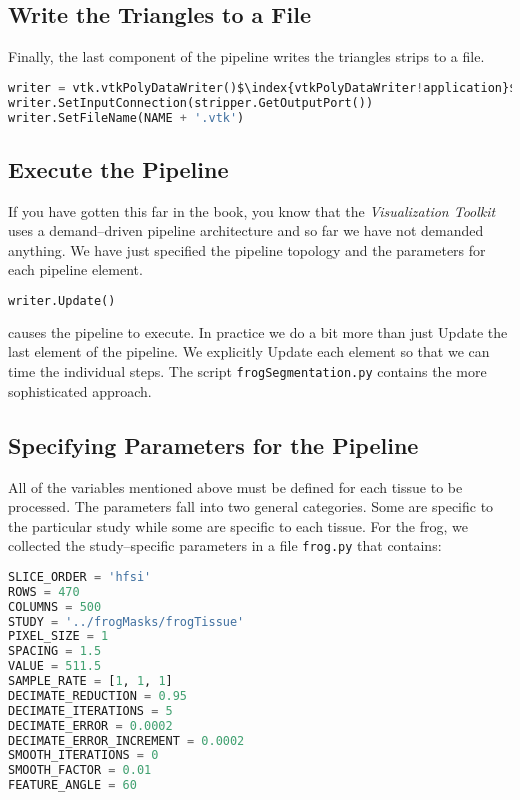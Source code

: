 \subsection{Write the Triangles to a File}

Finally, the last component of the pipeline writes the triangles strips to a file.

\begin{lstlisting}[language=Python, caption={Write the Triangles to a File.}, escapechar=\$]
writer = vtk.vtkPolyDataWriter()$\index{vtkPolyDataWriter!application}$
writer.SetInputConnection(stripper.GetOutputPort())
writer.SetFileName(NAME + '.vtk')
\end{lstlisting}

\subsection{Execute the Pipeline}

If you have gotten this far in the book, you know that the \emph{Visualization Toolkit} uses a demand--driven pipeline architecture and so far we have not demanded anything. We have just specified the pipeline topology and the parameters for each pipeline element.

\begin{lstlisting}[language=Python, caption={}, numbers=none, frame=none]
writer.Update()
\end{lstlisting}

\noindent causes the pipeline to execute. In practice we do a bit more than just Update the last element of the pipeline. We explicitly Update each element so that we can time the individual steps. The script \texttt{frogSegmentation.py} contains the more sophisticated approach.

\subsection{Specifying Parameters for the Pipeline}

All of the variables mentioned above must be defined for each tissue
to be processed. The parameters fall into two general categories. Some are specific to the particular study while some are specific to each tissue. For the frog, we collected the study--specific parameters in a file \texttt{frog.py} that contains:

\begin{lstlisting}[language=Python, caption={Specifying Parameters for the Pipeline.}]
SLICE_ORDER = 'hfsi'
ROWS = 470
COLUMNS = 500
STUDY = '../frogMasks/frogTissue'
PIXEL_SIZE = 1
SPACING = 1.5
VALUE = 511.5
SAMPLE_RATE = [1, 1, 1]
DECIMATE_REDUCTION = 0.95
DECIMATE_ITERATIONS = 5
DECIMATE_ERROR = 0.0002
DECIMATE_ERROR_INCREMENT = 0.0002
SMOOTH_ITERATIONS = 0
SMOOTH_FACTOR = 0.01
FEATURE_ANGLE = 60
\end{lstlisting}

